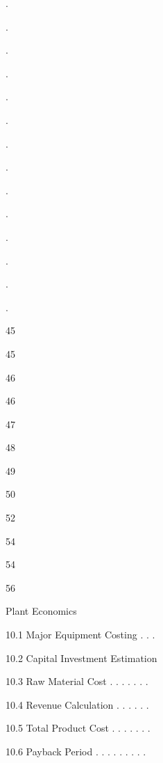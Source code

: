 \documentclass[a4paper,portrait,12pt]{article}
\begin{document}
.


.


.





.


.


.


.


.


.


.


.


.


.


.





45


45


46


46


47


48


49


50


52


54


54


56





\begin{flushleft}
 Plant Economics
\end{flushleft}


\begin{flushleft}
10.1 Major Equipment Costing . . .
\end{flushleft}


\begin{flushleft}
10.2 Capital Investment Estimation
\end{flushleft}


\begin{flushleft}
10.3 Raw Material Cost . . . . . . .
\end{flushleft}


\begin{flushleft}
10.4 Revenue Calculation . . . . . .
\end{flushleft}


\begin{flushleft}
10.5 Total Product Cost . . . . . . .
\end{flushleft}


\begin{flushleft}
10.6 Payback Period . . . . . . . . .
\end{flushleft}
\end{document}

